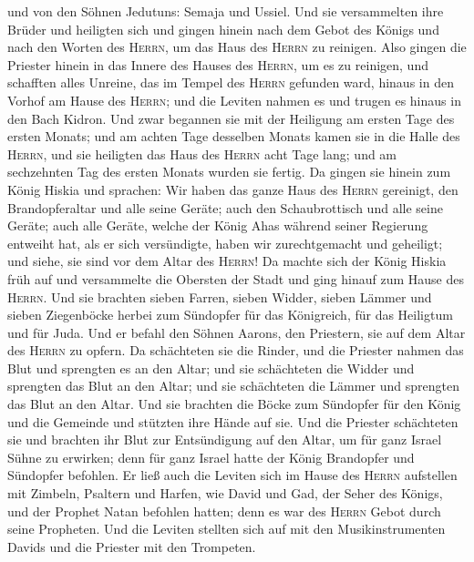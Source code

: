 und von den Söhnen Jedutuns: Semaja und Ussiel.  Und sie
versammelten ihre Brüder und heiligten sich und gingen hinein nach dem
Gebot des Königs und nach den Worten des \textsc{Herrn}, um das Haus des
\textsc{Herrn} zu reinigen.  Also gingen die Priester
hinein in das Innere des Hauses des \textsc{Herrn}, um es zu reinigen,
und schafften alles Unreine, das im Tempel des \textsc{Herrn} gefunden
ward, hinaus in den Vorhof am Hause des \textsc{Herrn}; und die Leviten
nahmen es und trugen es hinaus in den Bach Kidron.  Und
zwar begannen sie mit der Heiligung am ersten Tage des ersten Monats;
und am achten Tage desselben Monats kamen sie in die Halle des
\textsc{Herrn}, und sie heiligten das Haus des \textsc{Herrn} acht Tage
lang; und am sechzehnten Tag des ersten Monats wurden sie fertig.
 Da gingen sie hinein zum König Hiskia und sprachen: Wir
haben das ganze Haus des \textsc{Herrn} gereinigt, den Brandopferaltar
und alle seine Geräte; auch den Schaubrottisch und alle seine Geräte;
 auch alle Geräte, welche der König Ahas während seiner
Regierung entweiht hat, als er sich versündigte, haben wir
zurechtgemacht und geheiligt; und siehe, sie sind vor dem Altar des
\textsc{Herrn}!  Da machte sich der König Hiskia früh auf
und versammelte die Obersten der Stadt und ging hinauf zum Hause des
\textsc{Herrn}.  Und sie brachten sieben Farren, sieben
Widder, sieben Lämmer und sieben Ziegenböcke herbei zum Sündopfer für
das Königreich, für das Heiligtum und für Juda. Und er befahl den Söhnen
Aarons, den Priestern, sie auf dem Altar des \textsc{Herrn} zu opfern.
 Da schächteten sie die Rinder, und die Priester nahmen
das Blut und sprengten es an den Altar; und sie schächteten die Widder
und sprengten das Blut an den Altar; und sie schächteten die Lämmer und
sprengten das Blut an den Altar.  Und sie brachten die
Böcke zum Sündopfer für den König und die Gemeinde und stützten ihre
Hände auf sie.  Und die Priester schächteten sie und
brachten ihr Blut zur Entsündigung auf den Altar, um für ganz Israel
Sühne zu erwirken; denn für ganz Israel hatte der König Brandopfer und
Sündopfer befohlen.  Er ließ auch die Leviten sich im
Hause des \textsc{Herrn} aufstellen mit Zimbeln, Psaltern und Harfen,
wie David und Gad, der Seher des Königs, und der Prophet Natan befohlen
hatten; denn es war des \textsc{Herrn} Gebot durch seine Propheten.
 Und die Leviten stellten sich auf mit den
Musikinstrumenten Davids und die Priester mit den Trompeten.
